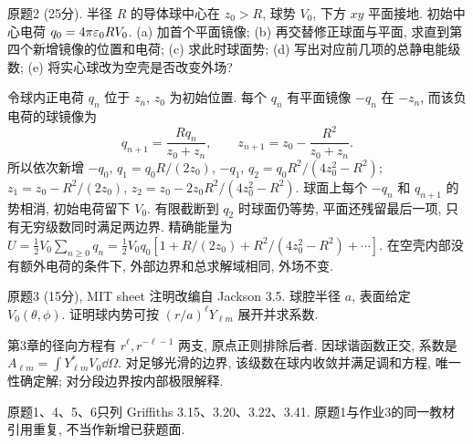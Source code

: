 \begin{exercise}
原题2 (25分). 半径 $R$ 的导体球中心在 $z_0>R$, 球势 $V_0$, 下方 $xy$ 平面接地. 初始中心电荷 $q_0=4\pi\varepsilon_0 RV_0$. (a) 加首个平面镜像; (b) 再交替修正球面与平面, 求直到第四个新增镜像的位置和电荷; (c) 求此时球面势; (d) 写出对应前几项的总静电能级数; (e) 将实心球改为空壳是否改变外场?
\end{exercise}
\begin{solution}
令球内正电荷 $q_n$ 位于 $z_n$, $z_0$ 为初始位置. 每个 $q_n$ 有平面镜像 $-q_n$ 在 $-z_n$, 而该负电荷的球镜像为
\[
q_{n+1}=\frac{Rq_n}{z_0+z_n},\qquad z_{n+1}=z_0-\frac{R^2}{z_0+z_n}.
\]
所以依次新增 $-q_0$, $q_1=q_0R/(2z_0)$, $-q_1$, $q_2=q_0R^2/(4z_0^2-R^2)$; $z_1=z_0-R^2/(2z_0)$, $z_2=z_0-2z_0R^2/(4z_0^2-R^2)$. 球面上每个 $-q_n$ 和 $q_{n+1}$ 的势相消, 初始电荷留下 $V_0$. 有限截断到 $q_2$ 时球面仍等势, 平面还残留最后一项, 只有无穷级数同时满足两边界. 精确能量为
$U=\frac12V_0\sum_{n\ge0}q_n=\frac12V_0q_0[1+R/(2z_0)+R^2/(4z_0^2-R^2)+\cdots]$.
在空壳内部没有额外电荷的条件下, 外部边界和总求解域相同, 外场不变.
\end{solution}
\begin{exercise}
原题3 (15分), MIT sheet 注明改编自 Jackson 3.5. 球腔半径 $a$, 表面给定 $V_0(\theta,\phi)$. 证明球内势可按 $(r/a)^\ell Y_{\ell m}$ 展开并求系数.
\end{exercise}
\begin{solution}
第3章的径向方程有 $r^\ell,r^{-\ell-1}$ 两支, 原点正则排除后者. 因球谐函数正交, 系数是 $A_{\ell m}=\int Y_{\ell m}^*V_0\dd\Omega$. 对足够光滑的边界, 该级数在球内收敛并满足调和方程, 唯一性确定解; 对分段边界按内部极限解释.
\end{solution}
原题1、4、5、6只列 Griffiths 3.15、3.20、3.22、3.41. 原题1与作业3的同一教材引用重复, 不当作新增已获题面.

